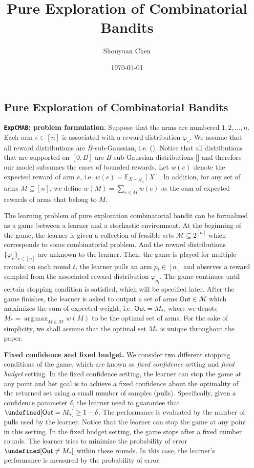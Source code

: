 \documentclass{article}
\title{Pure Exploration of Combinatorial Bandits}
\author{Shouyuan Chen}
\date{\today}
\newcommand{\Problem}{\texttt{ExpCMAB}\xspace}
\newcommand{\Rew}{\varphi}
\newcommand{\E}{\mathbb E}
\newcommand{\M}{\mathcal M}
\DeclareMathOperator*{\argmax}{arg\,max}
\newcommand{\out}{\mathsf{Out}}
\let\Pr\undefined
\DeclareMathOperator{\Pr}{Pr}
\begin{document}
\begin{spacing}{1.1}
\newpage

\maketitle


\section{Pure Exploration of Combinatorial Bandits}


\textbf{\Problem: problem formulation.}
Suppose that the arms are numbered $1,2,\ldots,n$.
Each arm $e\in[n]$ is associated with a reward distribution $\Rew_e$. 
We assume that all reward distributions are $B$-sub-Gaussian, i.e. ().
Notice that all distributions that are supported on $[0,B]$ are $B$-sub-Gaussian distributions [] and therefore our model subsumes the cases of bounded rewards.
Let $w(e)$ denote the expected reward of arm $e$, i.e. $w(e)=\E_{X\sim \Rew_e}[X]$.
In addition, for any set of arms $M\subseteq [n]$, we define $w(M) = \sum_{e\in M} w(e)$ as the sum of expected rewards of arms that belong to $M$.

The learning problem of pure exploration combinatorial bandit can be formalized as a game between a learner and a stochastic environment.
At the beginning of the game, the learner is given a collection of feasible sets $\M\subseteq 2^{[n]}$ which corresponds to some combinatorial problem. 
And the reward distributions $\{\Rew_e\}_{e\in[n]}$ are unknown to the learner.
Then, the game is played for multiple rounds;
on each round $t$, the learner pulls an arm $p_t\in [n]$ and observes a reward sampled from the associated reward distribution $\Rew_{p_t}$.
The game continues until certain stopping condition is satisfied, which will be specified later.
After the game finishes, the learner is asked to output a set of arms $\out \in \M$ which maximizes the sum of expected weight, i.e. $\out=M_*$, where we denote $M_*=\argmax_{M\in \M} w(M)$ to be the optimal set of arms.
For the sake of simplicity, we shall assume that the optimal set $M_*$ is unique throughout the paper.



\textbf{Fixed confidence and fixed budget.} We consider two different stopping conditions of the game, which are known as \emph{fixed confidence} setting and \emph{fixed budget} setting. 
In the fixed confidence setting, the learner can stop the game at any point and her goal is to achieve a fixed confidence about the optimality of the returned set using a small number of samples (pulls).
Specifically, given a confidence parameter $\delta$, the learner need to guarantee that $\Pr[\out = M_*] \ge 1-\delta$.
The performance is evaluated by the number of pulls used by the learner.
Notice that the learner can stop the game at any point in this setting.
In the fixed budget setting, the game stops after a fixed number rounds.
The learner tries to minimize the probability of error $\Pr[\out \not= M_*]$ within these rounds.
In this case, the learner's performance is measured by the probability of error.



\end{spacing}
\end{document}
